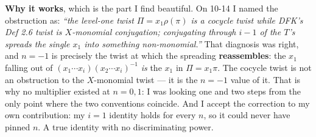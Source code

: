 \documentclass[11pt,a4paper]{article}
\begin{document}
\textbf{Why it works}, which is the part I find beautiful. On 10-14 I named the obstruction as:
\emph{``the level-one twist $\Pi=x_1\rho(\pi)$ is a cocycle twist while DFK's Def 2.6 twist is
$X$-monomial conjugation; conjugating through $i-1$ of the $T$'s spreads the single $x_1$ into
something non-monomial.''} That diagnosis was right, and $n=-1$ is precisely the twist at which the
spreading \textbf{reassembles}: the $x_1$ falling out of $(x_1\cdots x_i)(x_2\cdots x_i)^{-1}$
\emph{is} the $x_1$ in $\Pi=x_1\pi$. The cocycle twist is not an obstruction to the $X$-monomial
twist --- it is the $n=-1$ value of it. That is why no multiplier existed at $n=0,1$: I was looking
one and two steps from the only point where the two conventions coincide. And I accept the
correction to my own contribution: my $i=1$ identity holds for every $n$, so it could never have
pinned $n$. A true identity with no discriminating power.
\end{document}
